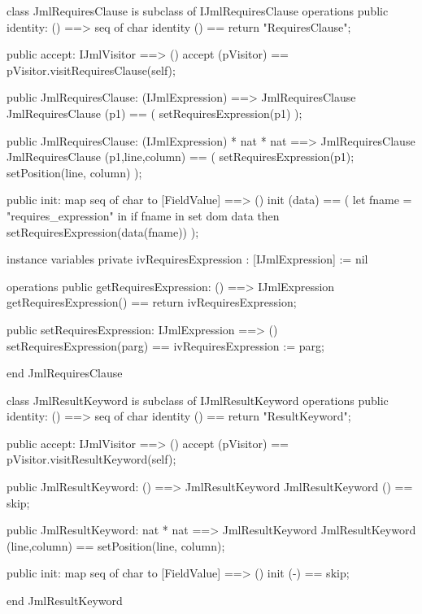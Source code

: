 \begin{vdm_al}
class JmlRequiresClause is subclass of IJmlRequiresClause
operations
  public identity: () ==> seq of char
  identity () == return "RequiresClause";

  public accept: IJmlVisitor ==> ()
  accept (pVisitor) == pVisitor.visitRequiresClause(self);

  public JmlRequiresClause:
    (IJmlExpression) ==> JmlRequiresClause
  JmlRequiresClause (p1) == 
    ( setRequiresExpression(p1) );

  public JmlRequiresClause:
    (IJmlExpression) *
    nat *
    nat ==> JmlRequiresClause
  JmlRequiresClause (p1,line,column) == 
    ( setRequiresExpression(p1);
      setPosition(line, column) );

  public init: map seq of char to [FieldValue] ==> ()
  init (data) ==
    ( let fname = "requires_expression" in
        if fname in set dom data
        then setRequiresExpression(data(fname)) );

instance variables
  private ivRequiresExpression : [IJmlExpression] := nil

operations
  public getRequiresExpression: () ==> IJmlExpression
  getRequiresExpression() == return ivRequiresExpression;

  public setRequiresExpression: IJmlExpression ==> ()
  setRequiresExpression(parg) == ivRequiresExpression := parg;

end JmlRequiresClause
\end{vdm_al}

\begin{vdm_al}
class JmlResultKeyword is subclass of IJmlResultKeyword
operations
  public identity: () ==> seq of char
  identity () == return "ResultKeyword";

  public accept: IJmlVisitor ==> ()
  accept (pVisitor) == pVisitor.visitResultKeyword(self);

  public JmlResultKeyword:
    () ==> JmlResultKeyword
  JmlResultKeyword () == 
    skip;

  public JmlResultKeyword:
    nat *
    nat ==> JmlResultKeyword
  JmlResultKeyword (line,column) == 
    setPosition(line, column);

  public init: map seq of char to [FieldValue] ==> ()
  init (-) == skip;

end JmlResultKeyword
\end{vdm_al}

